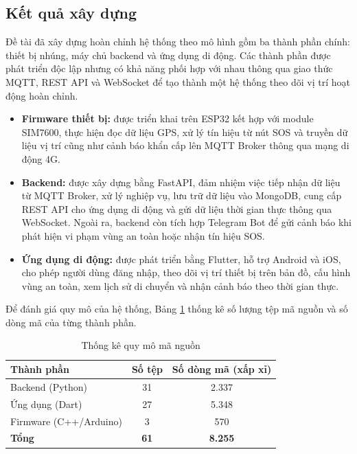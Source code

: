 \documentclass[../DoAn.tex]{subfiles}
\begin{document}
    \subsection{Kết quả xây dựng}

    Đề tài đã xây dựng hoàn chỉnh hệ thống theo mô hình gồm ba thành phần chính: thiết bị nhúng, máy chủ backend và ứng dụng di động. Các thành phần được phát triển độc lập nhưng có khả năng phối hợp với nhau thông qua giao thức MQTT, REST API và WebSocket để tạo thành một hệ thống theo dõi vị trí hoạt động hoàn chỉnh.

    \begin{itemize}
        \item \textbf{Firmware thiết bị:} được triển khai trên ESP32 kết hợp với module SIM7600, thực hiện đọc dữ liệu GPS, xử lý tín hiệu từ nút SOS và truyền dữ liệu vị trí cũng như cảnh báo khẩn cấp lên MQTT Broker thông qua mạng di động 4G.
        \item \textbf{Backend:} được xây dựng bằng FastAPI, đảm nhiệm việc tiếp nhận dữ liệu từ MQTT Broker, xử lý nghiệp vụ, lưu trữ dữ liệu vào MongoDB, cung cấp REST API cho ứng dụng di động và gửi dữ liệu thời gian thực thông qua WebSocket. Ngoài ra, backend còn tích hợp Telegram Bot để gửi cảnh báo khi phát hiện vi phạm vùng an toàn hoặc nhận tín hiệu SOS.
        \item \textbf{Ứng dụng di động:} được phát triển bằng Flutter, hỗ trợ Android và iOS, cho phép người dùng đăng nhập, theo dõi vị trí thiết bị trên bản đồ, cấu hình vùng an toàn, xem lịch sử di chuyển và nhận cảnh báo theo thời gian thực.
    \end{itemize}

    Để đánh giá quy mô của hệ thống, Bảng \ref{table:thongke} thống kê số lượng tệp mã nguồn và số dòng mã của từng thành phần.

    \begin{table}[H]
    \centering
    \caption{Thống kê quy mô mã nguồn}
    \label{table:thongke}
    \begin{tabular}{|l|c|c|}
    \hline
    \textbf{Thành phần} & \textbf{Số tệp} & \textbf{Số dòng mã (xấp xỉ)} \\ \hline
    Backend (Python)        & 31 & 2.337 \\ \hline
    Ứng dụng (Dart)         & 27 & 5.348 \\ \hline
    Firmware (C++/Arduino)  & 3  & 570 \\ \hline
    \textbf{Tổng}           & \textbf{61} & \textbf{8.255} \\ \hline
    \end{tabular}
    \end{table}
\end{document}
